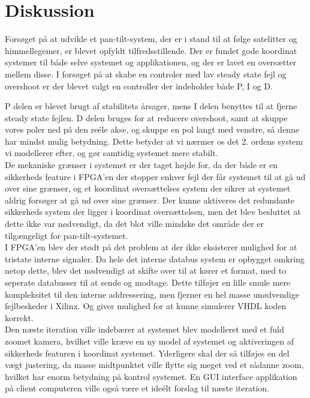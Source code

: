 \section{Diskussion}

Forsøget på at udvikle et pan-tilt-system, der er i stand til at følge satelitter og himmellegemer, er blevet opfyldt tilfredsstillende. Der er fundet gode koordinat systemer til både selve systemet og applikationen, og der er lavet en oversætter mellem disse. I forsøget på at skabe en controler med lav steady state fejl og overshoot er der blevet valgt en controller der indeholder både P, I og D.

P delen er blevet brugt af stabilitets årsager, mens I delen benyttes til at fjerne steady state fejlen. D delen bruges for at reducere overshoot, samt at skuppe vores poler ned på den reéle akse, og skuppe en pol langt med venstre, så denne har mindst mulig betydning. Dette betyder at vi nærmer os det 2. ordens system vi modellerer efter, og gør samtidig systemet mere stabilt.
\\
De mekaniske grænser i systemet er der taget højde for, da der både er en sikkerheds feature i FPGA'en der stopper enhver fejl der får systemet til at gå ud over sine grænser, og et koordinat oversættelses system der sikrer at systemet aldrig forsøger at gå ud over sine grænser. Der kunne aktiveres det redundante sikkerheds system der ligger i koordinat oversættelsen, men det blev besluttet at dette ikke var nødvendigt, da det blot ville mindske det område der er tilgængeligt for pan-tilt-systemet.
\\
I FPGA'en blev der stødt på det problem at der ikke eksisterer mulighed for at tristate interne signaler. Da hele det interne databus system er opbygget omkring netop dette, blev det nødvendigt at skifte over til at kører et format, med to seperate databusser til at sende og modtage. Dette tilføjer en lille smule mere kompleksitet til den interne addressering, men fjerner en hel masse unødvendige fejlbeskeder i Xilinx. Og giver mulighed for at kunne simulerer VHDL koden korrekt.
\\
Den næste iteration ville indebærer at systemet blev modelleret med et fuld zoomet kamera, hvilket ville kræve en ny model af systemet og aktiveringen af sikkerheds featuren i koordinat systemet. Yderligere skal der så tilføjes en del vægt justering, da masse midtpunktet ville flytte sig meget ved et sådanne zoom, hvilket har enorm betydning på kontrol systemet. En GUI interface applikation på client computeren ville også være et ideélt forslag til næste iteration.




